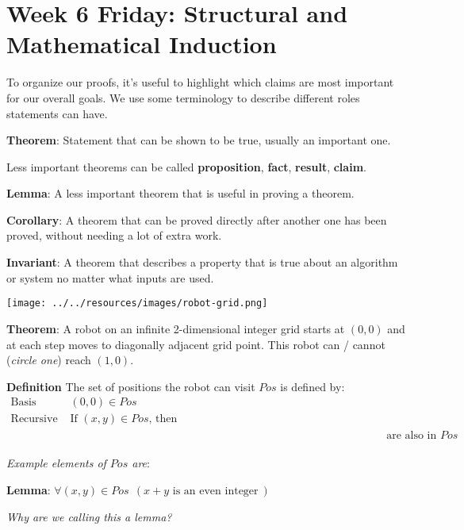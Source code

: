 \documentclass[12pt, oneside]{article}
\begin{document}
\section*{Week 6 Friday: Structural and Mathematical Induction}


To organize our proofs, it's useful to highlight which claims are most important for 
our overall goals.
We use some terminology to describe different roles statements can have.

{\bf Theorem}: Statement that can be shown to be true, usually an important one.

Less important theorems can be called {\bf proposition}, {\bf fact}, {\bf result}, {\bf claim}.

{\bf Lemma}: A less important theorem that is useful in proving a theorem.
 
{\bf Corollary}: A theorem that can be proved directly after another one has been proved, 
without needing a lot of extra work.

{\bf Invariant}: A theorem that describes a property that is true about an algorithm or 
system no matter what inputs are used.




 

\begin{center}
    \texttt{[image: ../../resources/images/robot-grid.png]}
\end{center}
    
{\bf Theorem}: A robot on an infinite 2-dimensional integer grid starts at $(0,0)$ and at each step moves
to diagonally adjacent grid point. This robot can / cannot {\footnotesize({\it circle one})} reach $(1,0)$.


{\bf Definition} The set of positions the robot can visit  $Pos$ is defined by:
\[
\begin{array}{ll}
    \textrm{Basis Step: } & (0,0) \in Pos \\
    \textrm{Recursive Step: } & \textrm{If } (x,y) \in Pos \textrm{, then } \\
    &\phantom{(x+1, y+1), (x+1, y-1), (x-1, y-1), (x-1, y+1)} \textrm{ are also in } Pos
\end{array}
\]

{\it Example elements of $Pos$ are}:
\vspace{20pt}

{\bf Lemma}: $\forall (x,y) \in Pos~~( x+y \textrm{ is an even integer}~)$

{\it Why are we calling this a lemma?}
\end{document}
